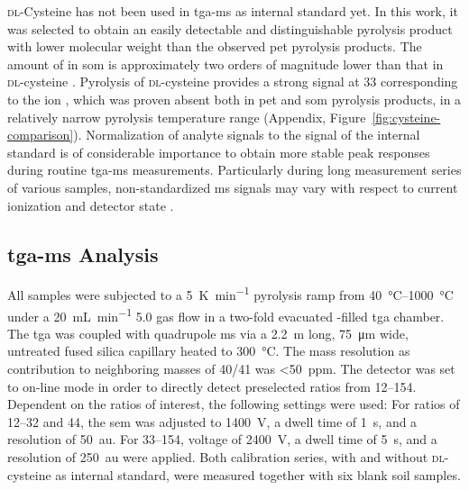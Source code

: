 \textsc{dl}-Cysteine has not been used in \ac{tga-ms} as internal standard yet. In this work, it was selected to obtain an easily detectable and distinguishable pyrolysis product with lower molecular weight than the observed \ac{pet} pyrolysis products. The amount of  in \ac{som} is approximately two orders of magnitude lower than that in \textsc{dl}-cysteine \citep{BlumeScheffer2016}. Pyrolysis of \textsc{dl}-cysteine provides a strong signal at \SI{33}{\mz} corresponding to the  ion \citep{ChoiDetermination1995}, which was proven absent both in \ac{pet} and \ac{som} pyrolysis products, in a relatively narrow pyrolysis temperature range (Appendix, Figure~\ref{fig:cysteine-comparison}).
Normalization of analyte signals to the signal of the internal standard is of considerable importance to obtain more stable peak responses during routine \ac{tga-ms} measurements. Particularly during long measurement series of various samples, non-standardized \ac{ms} signals may vary with respect to current ionization and detector state \citep{NetzschGeratebauMS2010}.

\subsection{\Acs{tga-ms} Analysis}\label{sec:tga-ms-analysis}

All samples were subjected to a \SI{5}{\kelvin\per\minute} pyrolysis ramp from \SIrange[range-phrase = { to }]{40}{1000}{\degreeCelsius} under a \SI{20}{\milli\liter\per\minute}  5.0 gas flow in a two-fold evacuated -filled \ac{tga} chamber. The \ac{tga} was coupled with  quadrupole \ac{ms} via a \SI{2.2}{\meter} long, \SI{75}{\micro\meter} wide, untreated fused silica capillary heated to \SI{300}{\degreeCelsius}.
The mass resolution as contribution to neighboring masses of \num{40}/\num{41} was \SI{<50}{ppm}. The detector was set to on-line mode in order to directly detect preselected \si{\mz} ratios from \numrange[range-phrase = { to }]{12}{154}.
Dependent on the \si{\mz} ratios of interest, the following settings were used: For \si{\mz} ratios of \numrange{12}{32} and \num{44}, the \ac{sem} was adjusted to \SI{1400}{\volt}, a dwell time of \SI{1}{\second}, and a resolution of \SI{50}{au}. For \si{\mz} \numrange{33}{154},  voltage of \SI{2400}{\volt}, a dwell time of \SI{5}{\second}, and a resolution of \SI{250}{au} were applied.
Both calibration series, with and without \textsc{dl}-cysteine as internal standard, were measured together with six blank soil samples.

